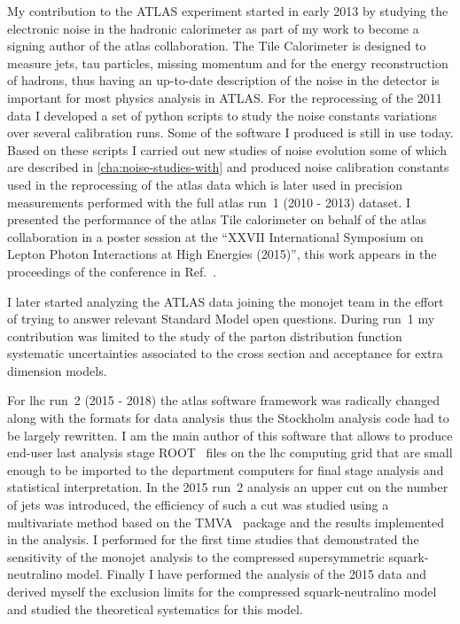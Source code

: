 My contribution to the ATLAS experiment started in early 2013 by studying the
electronic noise in the hadronic calorimeter as part of my work to become a
signing author of the \gls{atlas} collaboration. The Tile Calorimeter is
designed to measure jets, tau particles, missing momentum and for the energy
reconstruction of hadrons, thus having an up-to-date description of the noise in
the detector is important for most physics analysis in ATLAS\@. For the
reprocessing of the 2011 data I developed a set of python scripts to study the
noise constants variations over several calibration runs. Some of the software I
produced is still in use today. Based on these scripts I carried out new studies
of noise evolution some of which are described in \cref{cha:noise-studies-with}
and produced noise calibration constants used in the reprocessing of the
\gls{atlas} data which is later used in precision measurements performed with
the full \gls{atlas} run~1 (2010 - 2013) dataset. I presented the performance of
the \gls{atlas} Tile calorimeter on behalf of the \gls{atlas} collaboration in a
poster session at the ``XXVII International Symposium on Lepton Photon
Interactions at High Energies (2015)'', this work appears in the proceedings of
the conference in Ref.~\cite{TileCalPerformanceBertoli}.

I later started analyzing the ATLAS data joining the monojet team in the effort
of trying to answer relevant Standard Model open questions. During run~1 my
contribution was limited to the study of the parton distribution function
systematic uncertainties associated to the cross section and acceptance for
extra dimension models.

For \gls{lhc} run~2 (2015 - 2018) the \gls{atlas} software framework was
radically changed along with the formats for data analysis thus the Stockholm
analysis code had to be largely rewritten. I am the main author of this software
that allows to produce end-user last analysis stage ROOT~\cite{CERNROOT} files
on the \gls{lhc} computing grid that are small enough to be imported to the
department computers for final stage analysis and statistical interpretation. In
the 2015 run~2 analysis an upper cut on the number of jets was introduced, the
efficiency of such a cut was studied using a multivariate method based on the
TMVA~\cite{TMVA} package and the results implemented in the analysis. I
performed for the first time studies that demonstrated the sensitivity of the
monojet analysis to the compressed supersymmetric squark-neutralino
model. Finally I have performed the analysis of the 2015 data and derived myself
the exclusion limits for the compressed squark-neutralino model and studied the
theoretical systematics for this model.

